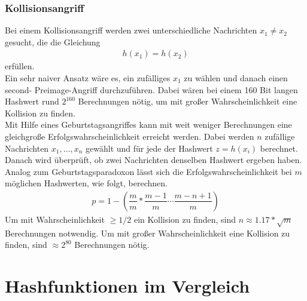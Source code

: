 \documentclass[12pt,a4paper]{scrartcl}
\numberwithin{equation}{section}
\numberwithin{myalgctr}{section}
\numberwithin{mytheoremctr}{section}
\begin{document}
	\subsubsection{Kollisionsangriff}
	Bei einem Kollisionsangriff werden zwei unterschiedliche Nachrichten $x_1\neq x_2$ gesucht, die  die Gleichung 
	\begin{align*}
		h(x_1) = h(x_2)
	\end{align*}
	erfüllen.\\
	Ein sehr naiver Ansatz wäre es, ein zufälliges $x_1$ zu wählen und danach einen second- Preimage-Angriff durchzuführen. Dabei wären bei einem 160 Bit langen Hashwert rund $2^{160}$ Berechnungen nötig, um mit großer Wahrscheinlichkeit eine Kollision zu finden. \\
	Mit Hilfe eines Geburtstagsangriffes kann mit weit weniger Berechnungen eine gleichgroße Erfolgswahrscheinlichkeit erreicht werden. Dabei werden $n$ zufällige Nachrichten $x_1,\dots ,x_n$ gewählt und für jede der Hashwert $z=h(x_i)$ berechnet. Danach wird überprüft, ob zwei Nachrichten denselben Hashwert ergeben haben. Analog zum Geburtstagsparadoxon lässt sich die Erfolgswahrscheinlichkeit bei $m$ möglichen Hashwerten, wie folgt, berechnen.
	\begin{align*}
	p=1-\left(\dfrac{m}{m} * \dfrac{m-1}{m}\cdots \dfrac{m-n+1}{m}\right)
	\end{align*}
	Um mit Wahrscheinlichkeit $\geq 1/2$ ein Kollision zu finden, sind $n\approx 1.17*\sqrt{m}$ Berechnungen notwendig. Um mit großer Wahrscheinlichkeit eine Kollision zu finden, sind $\approx 2^{80}$ Berechnungen nötig. \autocite[vgl.][S. 5 f.]{angriffAufMD5uSHA1}
	
	
	
	
	
	\newpage
	\section{Hashfunktionen im Vergleich}\label{vergleich}
\end{document}
